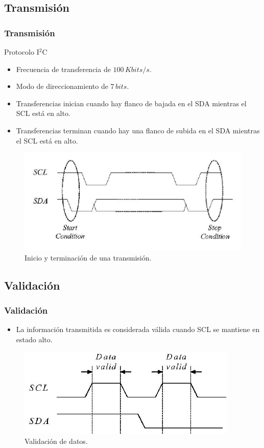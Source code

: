 \documentclass[pstricks,serif, 10pt]{beamer}
\begin{document}
\subsection{Transmisión}
\begin{frame}[allowframebreak]
 \frametitle{Transmisión}
 \begin{block}{Protocolo I$^2$C}
 \begin{itemize}
  \item Frecuencia de transferencia de $100\, Kbits/s$.
  \item Modo de direccionamiento de $7\, bits$.
 \end{itemize}
 \end{block}

  \begin{itemize}
   \item Transferencias inician cuando hay flanco de bajada en el SDA mientras el SCL está en alto.
   \item Transferencias terminan cuando hay una flanco de subida en el SDA mientras el SCL  está en alto.
  \end{itemize}
  \begin{figure}[H]
  \centering
    \includegraphics[scale=0.35]{trans.png}
      \caption{Inicio y terminación de una transmisión.}
	\label{fig1}
\end{figure}
\end{frame}

\subsection{Validación}
\begin{frame}[allowframebreak]
 \frametitle{Validación}
  \begin{itemize}
   \item La información transmitida es considerada válida cuando SCL se mantiene en estado alto.
  \end{itemize}
  \begin{figure}[H]
  \centering
    \includegraphics[scale=0.35]{val.png}
      \caption{Validación de datos.}
	\label{fig2}
\end{figure}
\end{frame}
\end{document}
